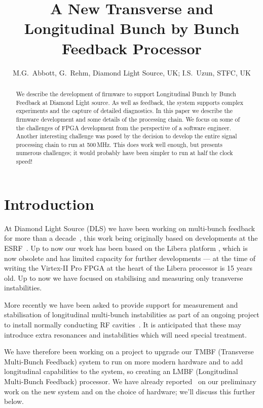 \documentclass[
    a4paper,
    keeplastbox,            %
    hyphens,                %
    boxit,                  %
]{jacow}
\begin{document}
\title{A New Transverse and Longitudinal Bunch by Bunch Feedback Processor}
\author{
    M.G.~Abbott, G.~Rehm, Diamond Light Source, UK; I.S.~Uzun, STFC, UK}
\maketitle

\begin{abstract}

We describe the development of firmware to support Longitudinal Bunch by Bunch
Feedback at Diamond Light source.  As well as feedback, the system supports
complex experiments and the capture of detailed diagnostics.  In this paper we
describe the firmware development and some details of the processing chain.  We
focus on some of the challenges of FPGA development from the perspective of a
software engineer.  Another interesting challenge was posed by the decision to
develop the entire signal processing chain to run at 500\,MHz.  This does work
well enough, but presents numerous challenges; it would probably have been
simpler to run at half the clock speed!

\end{abstract}


\section{Introduction}

At Diamond Light Source (DLS) we have been working on multi-bunch feedback for
more than a decade~\cite{dipac2007, epac2008, biw2010, icalepcs2011, ibic2013,
ibic2014, icalepcs2015}, this work being originally based on developments at the
ESRF~\cite{epac2006}.  Up to now our work has been based on the Libera platform
\cite{libera}, which is now obsolete and has limited capacity for further
developments --- at the time of writing the Virtex-II Pro FPGA at the heart of
the Libera processor is 15 years old.  Up to now we have focused on stabilising
and measuring only transverse instabilities.

More recently we have been asked to provide support for measurement and
stabilisation of longitudinal multi-bunch instabilities as part of an ongoing
project to install normally conducting RF cavities~\cite{ipac2017rf}.  It is
anticipated that these may introduce extra resonances and instabilities which
will need special treatment.

We have therefore been working on a project to upgrade our TMBF (Transverse
Multi-Bunch Feedback) system to run on more modern hardware and to add
longitudinal capabilities to the system, so creating an LMBF (Longitudinal
Multi-Bunch Feedback) processor.  We have already reported~\cite{ibic2016} on
our preliminary work on the new system and on the choice of hardware; we'll
discuss this further below.
\end{document}
